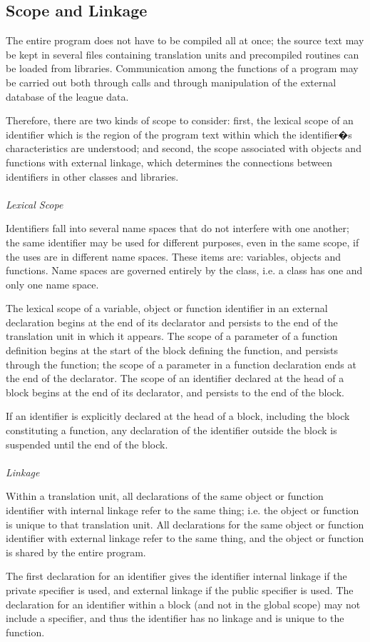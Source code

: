 \documentclass[12pt]{report}
\begin{document}
\subsection{Scope and Linkage}
\begin{doublespace}
The entire program does not have to be compiled all at once; the source text may be kept in several files containing translation units and precompiled routines can be loaded from libraries. Communication among the functions of a program may be carried out both through calls and through manipulation of the external database of the league data.

Therefore, there are two kinds of scope to consider: first, the lexical scope of an identifier which is the region of the program text within which the identifier�s characteristics are understood; and second, the scope associated with objects and functions with external linkage, which determines the connections between identifiers in other classes and libraries.\\
\\
\textit{Lexical Scope}

Identifiers fall into several name spaces that do not interfere with one another; the same identifier may be used for different purposes, even in the same scope, if the uses are in different name spaces. These items are: variables, objects and functions. Name spaces are governed entirely by the class, i.e. a class has one and only one name space.

The lexical scope of a variable, object or function identifier in an external declaration begins at the end of its declarator and persists to the end of the translation unit in which it appears. The scope of a parameter of a function definition begins at the start of the block defining the function, and persists through the function; the scope of a parameter in a function declaration ends at the end of the declarator. The scope of an identifier declared at the head of a block begins at the end of its declarator, and persists to the end of the block. 

If an identifier is explicitly declared at the head of a block, including the block constituting a function, any declaration of the identifier outside the block is suspended until the end of the block.\\
\\
\textit{Linkage}

Within a translation unit, all declarations of the same object or function identifier with internal linkage refer to the same thing; i.e. the object or function is unique to that translation unit. All declarations for the same object or function identifier with external linkage refer to the same thing, and the object or function is shared by the entire program.

The first declaration for an identifier gives the identifier internal linkage if the private specifier is used,  and external linkage if the public specifier is used. The declaration for an identifier within a block (and not in the global scope) may not include a specifier, and thus the identifier has no linkage and is unique to the function. 
\end{doublespace}
\end{document}
